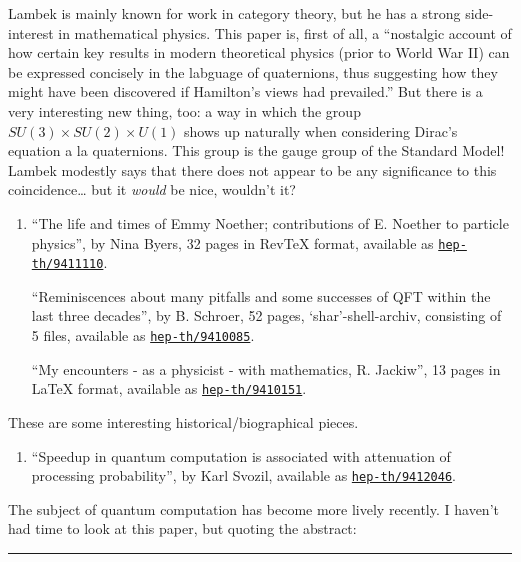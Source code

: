 \documentclass{article}
\def\tightlist{}
\begin{document}
Lambek is mainly known for work in category theory, but he has a strong
side-interest in mathematical physics. This paper is, first of all, a
``nostalgic account of how certain key results in modern theoretical
physics (prior to World War II) can be expressed concisely in the
labguage of quaternions, thus suggesting how they might have been
discovered if Hamilton's views had prevailed.'' But there is a very
interesting new thing, too: a way in which the group
\(SU(3) \times SU(2) \times U(1)\) shows up naturally when considering
Dirac's equation a la quaternions. This group is the gauge group of the
Standard Model! Lambek modestly says that there does not appear to be
any significance to this coincidence\ldots{} but it \emph{would} be
nice, wouldn't it?

\begin{enumerate}
\def\labelenumi{\arabic{enumi})}
\setcounter{enumi}{11}
\item
  ``The life and times of Emmy Noether; contributions of E. Noether to
  particle physics'', by Nina Byers, 32 pages in RevTeX format,
  available as
  \href{http://xxx.lanl.gov/abs/hep-th/9411110}{\texttt{hep-th/9411110}}.

  ``Reminiscences about many pitfalls and some successes of QFT within
  the last three decades'', by B. Schroer, 52 pages,
  `shar'-shell-archiv, consisting of 5 files, available as
  \href{http://xxx.lanl.gov/abs/hep-th/9410085}{\texttt{hep-th/9410085}}.

  ``My encounters - as a physicist - with mathematics, R. Jackiw'', 13
  pages in LaTeX format, available as
  \href{http://xxx.lanl.gov/abs/hep-th/9410151}{\texttt{hep-th/9410151}}.
\end{enumerate}

These are some interesting historical/biographical pieces.

\begin{enumerate}
\def\labelenumi{\arabic{enumi})}
\setcounter{enumi}{12}
\tightlist
\item
  ``Speedup in quantum computation is associated with attenuation of
  processing probability'', by Karl Svozil, available as
  \href{http://xxx.lanl.gov/abs/hep-th/9412046}{\texttt{hep-th/9412046}}.
\end{enumerate}

The subject of quantum computation has become more lively recently. I
haven't had time to look at this paper, but quoting the abstract:

\begin{center}\rule{0.5\linewidth}{0.5pt}\end{center}
\end{document}
